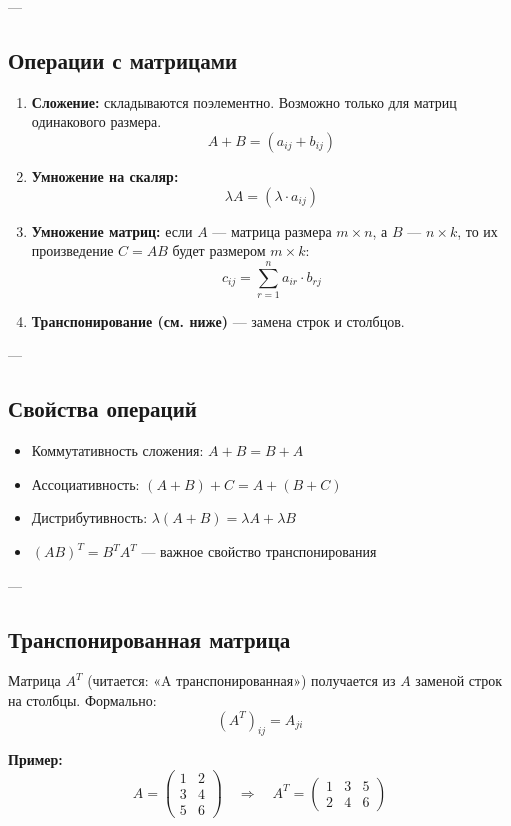---

\subsection*{Операции с матрицами}

\begin{enumerate}
  \item \textbf{Сложение:} складываются поэлементно. Возможно только для матриц одинакового размера.
  \[
  A + B = \left(a_{ij} + b_{ij}\right)
  \]

  \item \textbf{Умножение на скаляр:}
  \[
  \lambda A = \left(\lambda \cdot a_{ij}\right)
  \]

  \item \textbf{Умножение матриц:} если $A$ — матрица размера $m \times n$, а $B$ — $n \times k$, то их произведение $C = AB$ будет размером $m \times k$:
  \[
  c_{ij} = \sum_{r=1}^{n} a_{ir} \cdot b_{rj}
  \]

  \item \textbf{Транспонирование (см. ниже)} — замена строк и столбцов.
\end{enumerate}

---

\subsection*{Свойства операций}

\begin{itemize}
  \item Коммутативность сложения: $A + B = B + A$
  \item Ассоциативность: $(A + B) + C = A + (B + C)$
  \item Дистрибутивность: $\lambda(A + B) = \lambda A + \lambda B$
  \item $(AB)^T = B^T A^T$ — важное свойство транспонирования
\end{itemize}

---

\subsection*{Транспонированная матрица}

Матрица $A^T$ (читается: «A транспонированная») получается из $A$ заменой строк на столбцы. Формально:
\[
(A^T)_{ij} = A_{ji}
\]

\textbf{Пример:}
\[
A =
\begin{pmatrix}
1 & 2 \\
3 & 4 \\
5 & 6
\end{pmatrix} \quad \Rightarrow \quad
A^T =
\begin{pmatrix}
1 & 3 & 5 \\
2 & 4 & 6
\end{pmatrix}
\]

